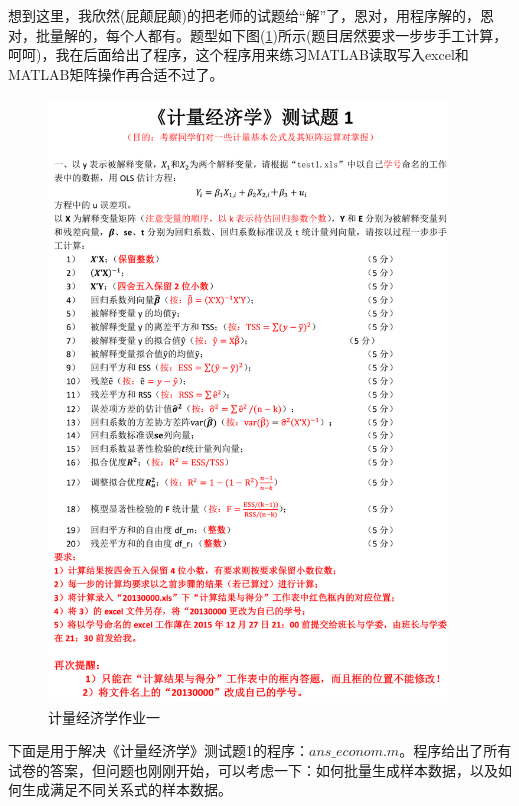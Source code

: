             \par
            想到这里，我欣然(屁颠屁颠)的把老师的试题给“解”了，恩对，用程序解的，恩对，批量解的，每个人都有。题型如下图(\ref{fig:Link_2})所示(题目居然要求一步步手工计算，呵呵)，我在后面给出了程序，这个程序用来练习MATLAB读取写入excel和MATLAB矩阵操作再合适不过了。
            \begin{figure}[H]
            \centering
            \includegraphics[height=16cm]{images/Link_2.jpg}
            \caption{计量经济学作业一}
            \label{fig:Link_2}
            \end{figure}
            \par
            下面是用于解决《计量经济学》测试题1的程序：$ans\_econom.m$。程序给出了所有试卷的答案，但问题也刚刚开始，可以考虑一下：如何批量生成样本数据，以及如何生成满足不同关系式的样本数据。
